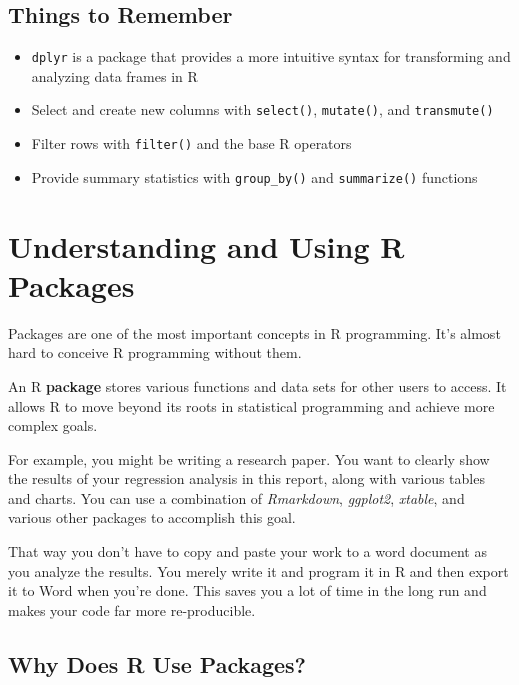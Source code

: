 \documentclass[
]{book}
\providecommand{\tightlist}{%
  \setlength{\itemsep}{0pt}\setlength{\parskip}{0pt}}
\begin{document}
\begin{center}
\hypertarget{things-to-remember-4}{%
\section{Things to Remember}\label{things-to-remember-4}}

\begin{itemize}
\tightlist
\item
  \texttt{dplyr} is a package that provides a more intuitive syntax for transforming and analyzing data frames in R
\item
  Select and create new columns with \texttt{select()}, \texttt{mutate()}, and \texttt{transmute()}
\item
  Filter rows with \texttt{filter()} and the base R operators
\item
  Provide summary statistics with \texttt{group\_by()} and \texttt{summarize()} functions
\end{itemize}

\hypertarget{packages}{%
\chapter{Understanding and Using R Packages}\label{packages}}

Packages are one of the most important concepts in R programming. It's almost hard to conceive R programming without them.

An R \textbf{package} stores various functions and data sets for other users to access. It allows R to move beyond its roots in statistical programming and achieve more complex goals.

For example, you might be writing a research paper. You want to clearly show the results of your regression analysis in this report, along with various tables and charts. You can use a combination of \emph{Rmarkdown}, \emph{ggplot2}, \emph{xtable}, and various other packages to accomplish this goal.

That way you don't have to copy and paste your work to a word document as you analyze the results. You merely write it and program it in R and then export it to Word when you're done. This saves you a lot of time in the long run and makes your code far more re-producible.

\hypertarget{why-does-r-use-packages}{%
\section{Why Does R Use Packages?}\label{why-does-r-use-packages}}


\end{center}
\end{document}
